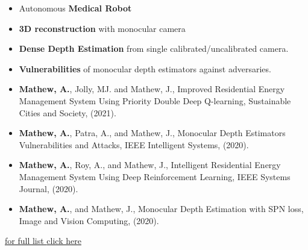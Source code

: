 \documentclass[10pt,a4paper,ragged2e, normalphoto]{altacv}
\begin{document}

\begin{itemize}
	\item Autonomous \textbf{Medical Robot}
	\item \textbf{3D reconstruction} with monocular camera
\end{itemize}

\divider


\begin{itemize}
	\item \textbf{Dense Depth Estimation} from single calibrated/uncalibrated camera.
	\item \textbf{Vulnerabilities} of monocular depth estimators against adversaries.
\end{itemize}



\begin{itemize}
	\item {\color{IFLightBlue} \textbf{Mathew, A.}}, Jolly, MJ. and Mathew, J., Improved Residential Energy Management System Using Priority Double Deep Q-learning, Sustainable Cities and Society, (2021).
	\item {\color{IFLightBlue} \textbf{Mathew, A.}}, Patra, A., and Mathew, J., Monocular Depth Estimators Vulnerabilities and Attacks, IEEE Intelligent Systems, (2020).
	\item {\color{IFLightBlue} \textbf{Mathew, A.}}, Roy, A., and Mathew, J., Intelligent Residential Energy Management System Using Deep Reinforcement Learning, IEEE Systems Journal, (2020).
	\item {\color{IFLightBlue} \textbf{Mathew, A.}}, and Mathew, J., Monocular Depth Estimation with SPN loss, Image and Vision Computing, (2020).
\end{itemize}

\hfill \href{https://alwynm.github.io/pub}{for full list {\color{IFLightBlue}click here}}
\end{document}
